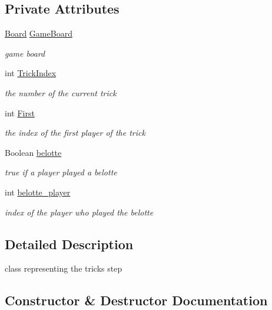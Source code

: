 \subsection*{Private Attributes}
\begin{DoxyCompactItemize}
\item 
\hyperlink{class_coinche_1_1_board}{Board} \hyperlink{class_coinche_1_1_tricks_a98e0ea7da7ca1f0e85513c91bf311fc6}{Game\+Board}
\begin{DoxyCompactList}\small\item\em game board \end{DoxyCompactList}\item 
int \hyperlink{class_coinche_1_1_tricks_a234997b0338ef3f6fe31159e789ff926}{Trick\+Index}
\begin{DoxyCompactList}\small\item\em the number of the current trick \end{DoxyCompactList}\item 
int \hyperlink{class_coinche_1_1_tricks_a989d0fe41242144d3b51145cce83195f}{First}
\begin{DoxyCompactList}\small\item\em the index of the first player of the trick \end{DoxyCompactList}\item 
Boolean \hyperlink{class_coinche_1_1_tricks_a52b326e759bb3b8db0eb4aac4673c84e}{belotte}
\begin{DoxyCompactList}\small\item\em true if a player played a belotte \end{DoxyCompactList}\item 
int \hyperlink{class_coinche_1_1_tricks_ad6c681dc74c4d3e916803c90bb8cb446}{belotte\+\_\+player}
\begin{DoxyCompactList}\small\item\em index of the player who played the belotte \end{DoxyCompactList}\end{DoxyCompactItemize}


\subsection{Detailed Description}
class representing the tricks step 



\subsection{Constructor \& Destructor Documentation}
\mbox{\label{class_coinche_1_1_tricks_afba8d7dcb751a3dde112f7f702399d00}} 
